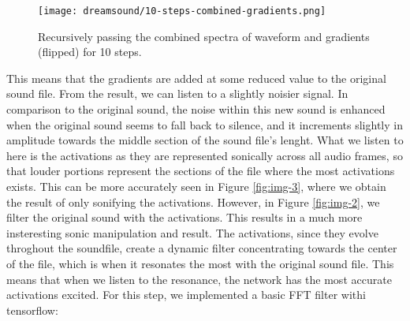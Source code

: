 \documentclass{nime-alternate}
\begin{document}
\begin{figure*}[htbp]
       \centering
              \texttt{[image: dreamsound/10-steps-combined-gradients.png]}
       \caption{Recursively passing the combined spectra of waveform and gradients (flipped) for 10 steps.}
       \label{fig:img-5}
\end{figure*}

This means that the gradients are added at some reduced value to the original sound file. From the result, we can listen to a slightly noisier signal. In comparison to the original sound, the noise within this new sound is enhanced when the original sound seems to fall back to silence, and it increments slightly in amplitude towards the middle section of the sound file's lenght. What we listen to here is the activations as they are represented sonically across all audio frames, so that louder portions represent the sections of the file where the most activations exists. This can be more accurately seen in Figure \ref{fig:img-3}, where we obtain the result of only sonifying the activations. However, in Figure \ref{fig:img-2}, we filter the original sound with the activations. This results in a much more insteresting sonic manipulation and result. The activations, since they evolve throghout the soundfile, create a dynamic filter concentrating towards the center of the file, which is when it resonates the most with the original sound file. This means that when we listen to the resonance, the network has the most accurate activations excited. For this step, we implemented a basic FFT filter withi tensorflow:
\end{document}
